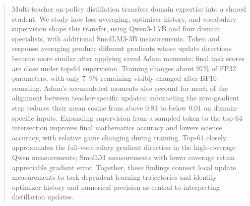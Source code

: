 \begin{abstract}
Multi-teacher on-policy distillation transfers domain expertise into a shared student. We study how loss averaging, optimizer history, and vocabulary supervision shape this transfer, using Qwen3-1.7B and four domain specialists, with additional SmolLM3-3B measurements. Token and response averaging produce different gradients whose update directions become more similar after applying saved Adam moments; final task scores are close under top-64 supervision. Training changes about 97\% of FP32 parameters, with only 7--9\% remaining visibly changed after BF16 rounding. Adam's accumulated moments also account for much of the alignment between teacher-specific updates: subtracting the zero-gradient step reduces their mean cosine from above 0.83 to below 0.01 on domain-specific inputs. Expanding supervision from a sampled token to the top-64 intersection improves final mathematics accuracy and lowers science accuracy, with relative gains changing during training. Top-64 closely approximates the full-vocabulary gradient direction in the high-coverage Qwen measurements; SmolLM measurements with lower coverage retain appreciable gradient error. Together, these findings connect local update measurements to task-dependent learning trajectories and identify optimizer history and numerical precision as central to interpreting distillation updates.
\end{abstract}
